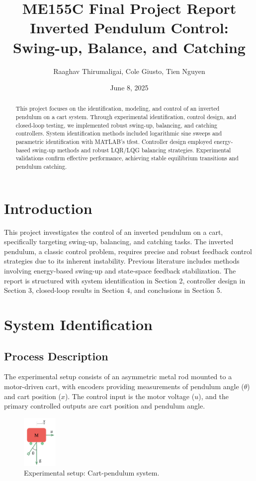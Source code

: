 \documentclass[12pt]{article}
\title{ME155C Final Project Report\\Inverted Pendulum Control: Swing-up, Balance, and Catching}
\author{Raaghav Thirumaligai, Cole Giusto, Tien Nguyen}
\date{June 8, 2025}
\begin{document}
\maketitle

\begin{abstract}
This project focuses on the identification, modeling, and control of an inverted pendulum on a cart system. Through experimental identification, control design, and closed-loop testing, we implemented robust swing-up, balancing, and catching controllers. System identification methods included logarithmic sine sweeps and parametric identification with MATLAB's tfest. Controller design employed energy-based swing-up methods and robust LQR/LQG balancing strategies. Experimental validations confirm effective performance, achieving stable equilibrium transitions and pendulum catching.
\end{abstract}
\clearpage
\section{Introduction}
This project investigates the control of an inverted pendulum on a cart, specifically targeting swing-up, balancing, and catching tasks. The inverted pendulum, a classic control problem, requires precise and robust feedback control strategies due to its inherent instability. Previous literature includes methods involving energy-based swing-up and state-space feedback stabilization. The report is structured with system identification in Section 2, controller design in Section 3, closed-loop results in Section 4, and conclusions in Section 5.

\section{System Identification}

\subsection{Process Description}
The experimental setup consists of an asymmetric metal rod mounted to a motor-driven cart, with encoders providing measurements of pendulum angle ($\theta$) and cart position ($x$). The control input is the motor voltage ($u$), and the primary controlled outputs are cart position and pendulum angle.

\begin{figure}[H]
    \centering
    \includegraphics[width=0.15\textwidth]{figures/system_setup.png}
    \caption{Experimental setup: Cart-pendulum system.}
    \label{fig:setup}
\end{figure}
\end{document}
